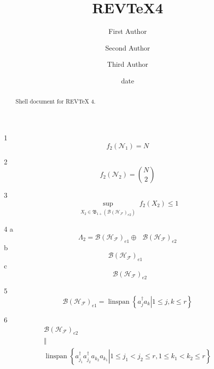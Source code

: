 \documentclass[aps,preprint]{revtex4}%
\begin{document}
\title[Short title for running header]{REV\TeX4}
\author{First Author}
\author{Second Author}
\author{Third Author}

\begin{abstract}
Shell document for REV\TeX{} 4.

\end{abstract}
\date[Date text]{date}




\maketitle
\tableofcontents


\section{}

1
\[
f_{2}\left(  \mathcal{N}_{1}\right)  =N
\]


2
\[
f_{2}\left(  \mathcal{N}_{2}\right)  =\binom{N}{2}%
\]


3
\[
\sup_{\substack{X_{2}\in\mathfrak{B}_{1+}\left(  \mathcal{B}\left(
\mathcal{H}_{\mathcal{F}}\right)  _{e2}\right)  }}f_{2}\left(  X_{2}\right)
\leq1
\]


4 a%
\[
\Lambda_{2}=\mathcal{B}\left(  \mathcal{H}_{\mathcal{F}}\right)  _{e1}\text{
}\oplus\text{ }\mathcal{B}\left(  \mathcal{H}_{\mathcal{F}}\right)  _{e2}%
\]
b%
\[
\mathcal{B}\left(  \mathcal{H}_{\mathcal{F}}\right)  _{e1}\text{ }%
\]
c%
\[
\text{ }\mathcal{B}\left(  \mathcal{H}_{\mathcal{F}}\right)  _{e2}%
\]


5%
\[
\mathcal{B}\left(  \mathcal{H}_{\mathcal{F}}\right)  _{e1}%
=\operatorname*{linspan}\left\{  \left.  a_{j}^{\dagger}a_{k}\right\vert 1\leq
j,k\leq r\right\}
\]


6%
\begin{gather*}
\mathcal{B}\left(  \mathcal{H}_{\mathcal{F}}\right)  _{e2}\\
\Vert\\
\operatorname*{linspan}\left\{  \left.  a_{j_{1}}^{\dagger}a_{j_{2}}^{\dagger
}a_{k_{2}}a_{k_{1}}\right\vert 1\leq j_{1}<j_{2}\leq r,1\leq k_{1}<k_{2}\leq
r\right\}
\end{gather*}
\end{document}
